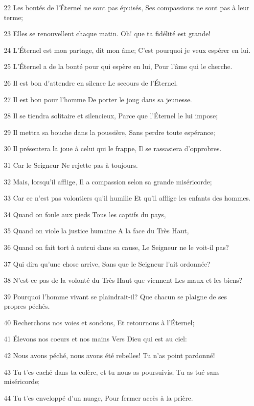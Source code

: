 \par 22 Les bontés de l'Éternel ne sont pas épuisés, Ses compassions ne sont pas à leur terme;
\par 23 Elles se renouvellent chaque matin. Oh! que ta fidélité est grande!
\par 24 L'Éternel est mon partage, dit mon âme; C'est pourquoi je veux espérer en lui.
\par 25 L'Éternel a de la bonté pour qui espère en lui, Pour l'âme qui le cherche.
\par 26 Il est bon d'attendre en silence Le secours de l'Éternel.
\par 27 Il est bon pour l'homme De porter le joug dans sa jeunesse.
\par 28 Il se tiendra solitaire et silencieux, Parce que l'Éternel le lui impose;
\par 29 Il mettra sa bouche dans la poussière, Sans perdre toute espérance;
\par 30 Il présentera la joue à celui qui le frappe, Il se rassasiera d'opprobres.
\par 31 Car le Seigneur Ne rejette pas à toujours.
\par 32 Mais, lorsqu'il afflige, Il a compassion selon sa grande miséricorde;
\par 33 Car ce n'est pas volontiers qu'il humilie Et qu'il afflige les enfants des hommes.
\par 34 Quand on foule aux pieds Tous les captifs du pays,
\par 35 Quand on viole la justice humaine A la face du Très Haut,
\par 36 Quand on fait tort à autrui dans sa cause, Le Seigneur ne le voit-il pas?
\par 37 Qui dira qu'une chose arrive, Sans que le Seigneur l'ait ordonnée?
\par 38 N'est-ce pas de la volonté du Très Haut que viennent Les maux et les biens?
\par 39 Pourquoi l'homme vivant se plaindrait-il? Que chacun se plaigne de ses propres péchés.
\par 40 Recherchons nos voies et sondons, Et retournons à l'Éternel;
\par 41 Élevons nos coeurs et nos mains Vers Dieu qui est au ciel:
\par 42 Nous avons péché, nous avons été rebelles! Tu n'as point pardonné!
\par 43 Tu t'es caché dans ta colère, et tu nous as poursuivis; Tu as tué sans miséricorde;
\par 44 Tu t'es enveloppé d'un nuage, Pour fermer accès à la prière.
